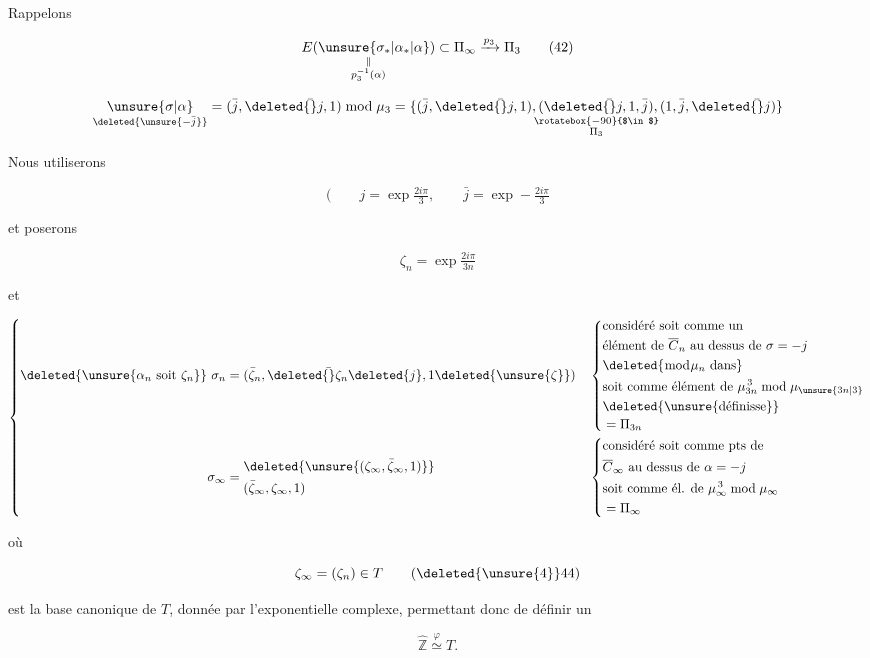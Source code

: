 
Rappelons

\[
\underset{\substack{\Vert\\p_3^{-1}(\alpha)}}{E(\unsure{\sigma_*|\alpha_*|\alpha})}\subset\Pi_\infty\xrightarrow{p_3}\Pi_3
\tag*{(42)}
\]

\[
\underset{\deleted{\unsure{-\bar j}}}{\unsure{\sigma|\alpha}}
=(\bar j,\deleted{\bar{\vphantom j}}j,1)\bmod\mu_3
=\underset{\substack{\rotatebox{-90}{$\in$}\\\Pi_3}}{\{(\bar j,\deleted{\bar{\vphantom j}}j,1),(\deleted{\bar{\vphantom j}}j,1,\bar j),(1,\bar j,\deleted{\bar{\vphantom j}}j)\}}
\]

 Nous  utiliserons

\[
(\qquad j=\exp\tfrac{2i\pi}{3},\qquad \bar j=\exp-\tfrac{2i\pi}{3}
\]

et poserons

\[
\zeta_n=\exp\tfrac{2i\pi}{3n}
\tag*{(43)}
\]

et

\[
\left\{\begin{aligned}
\deleted{\unsure{\alpha_n\text{ soit }\zeta_n}}\ \sigma_n
&=(\bar\zeta_n,\deleted{\bar{\vphantom\zeta}}\zeta_n\deleted{j},1\deleted{\unsure{\zeta}})
&&\left\{\begin{aligned}
&\text{considéré soit comme un}\\[-.3ex]
&\text{élément de }\overline C_n\text{ au dessus de }\sigma=-j\\
&\deleted{\bmod\mu_n\text{ dans}}\\
&\text{soit comme élément de }\mu_{3n}^{\,3}\bmod\mu_{\unsure{3n|3}}\\
&\deleted{\unsure{\text{définisse}}}\\[-.3ex]
&=\Pi_{3n}
\end{aligned}\right.\\
\sigma_\infty&=\begin{aligned}
&\deleted{\unsure{(\zeta_\infty,\bar\zeta_\infty,1)}}\\
&(\bar\zeta_\infty,\zeta_\infty,1)
\end{aligned}
&&\left\{\begin{aligned}
&\text{considéré soit comme pts de}\\
&\overline C_\infty\text{ au dessus de }\alpha=-j\\
&\text{soit comme él. de }\mu_\infty^{\,3}\bmod\mu_\infty\\
&=\Pi_\infty
\end{aligned}\right.
\end{aligned}\right.
\]

où

\[
\zeta_\infty=(\zeta_n)\in T
\tag*{(\deleted{\unsure{4}}44)}
\]

est la base canonique de $T$, donnée par l'exponentielle complexe, permettant donc de définir un 

\[
\widehat{\mathbb Z}\mathrel{\overset{\varphi}{\simeq}}T .
\tag*{(45)}
\]

